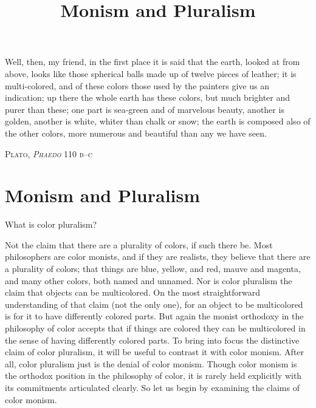 \documentclass[12pt]{article}
\title{Monism and Pluralism}
\author{\myauthor}
\date{} %
\begin{document}
\maketitle
\epigraph{Well, then, my friend, in the first place it is said that the earth, looked at from above, looks like those spherical balls made up of twelve pieces of leather; it is multi-colored, and of these colors those used by the painters give us an indication; up there the whole earth has these colors, but much brighter and purer than these; one part is sea-green and of marvelous beauty, another is golden, another is white, whiter than chalk or snow; the earth is composed also of the other colors, more numerous and beautiful than any we have seen.}{\textsc{Plato, \emph{Phaedo} 110 b--c}} %

\setlength{\parindent}{1em}


\section{Monism and Pluralism} %
\label{sec:monism_and_pluralism}

What is color pluralism? 

Not the claim that there are a plurality of colors, if such there be. Most philosophers are color monists, and if they are realists, they believe that there are a plurality of colors; that things are blue, yellow, and red, mauve and magenta, and many other colors, both named and unnamed. Nor is color pluralism the claim that objects can be multicolored. On the most straightforward understanding of that claim (not the only one), for an object to be multicolored is for it to have differently colored parts. But again the monist orthodoxy in the philosophy of color accepts that if things are colored they can be multicolored in the sense of having differently colored parts. To bring into focus the distinctive claim of color pluralism, it will be useful to contrast it with color monism. After all, color pluralism just is the denial of color monism. Though color monism is the orthodox position in the philosophy of color, it is rarely held explicitly with its commitments articulated clearly. So let us begin by examining the claims of color monism.
\end{document}
